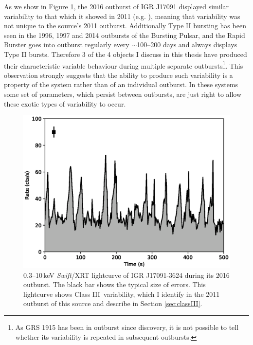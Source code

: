 \par As we show in Figure \ref{fig:IGR2016}, the 2016 outburst of IGR J17091 displayed similar variability to that which it showed in 2011 (e.g. \citealp{Reynolds_2016HB}), meaning that variability was not unique to the source's 2011 outburst.  Additionally Type II bursting has been seen in the 1996, 1997 and 2014 outbursts of the Bursting Pulsar, and the Rapid Burster goes into outburst regularly every $\sim$100--200 days and always displays Type II bursts.  Therefore 3 of the 4 objects I discuss in this thesis have produced their characteristic variable behaviour during multiple separate outbursts\footnote{As GRS 1915 has been in outburst since discovery, it is not possible to tell whether its variability is repeated in subsequent outbursts.}.  This observation strongly suggests that the ability to produce such variability is a property of the system rather than of an individual outburst.  In these systems some set of parameters, which persist between outbursts, are just right to allow these exotic types of variability to occur.

\begin{figure}
  \centering
  \includegraphics[width=.9\linewidth, trim= 0mm 0mm 10mm 10mm,clip]{images/new16plot.eps}
  \caption[A \textit{Swift}/XRT lightcurve of IGR J17091-3624 during its 2016 outburst, showing Class III variability.]{0.3--10\,keV \indexxrt\textit{Swift}/XRT lightcurve of IGR J17091-3624 during its 2016 outburst.  The black bar shows the typical size of errors.  This lightcurve shows Class III\indexiii\ variability, which I identify in the 2011 outburst of this source and describe in Section \ref{sec:classIII}.}
  \label{fig:IGR2016}
\end{figure}

